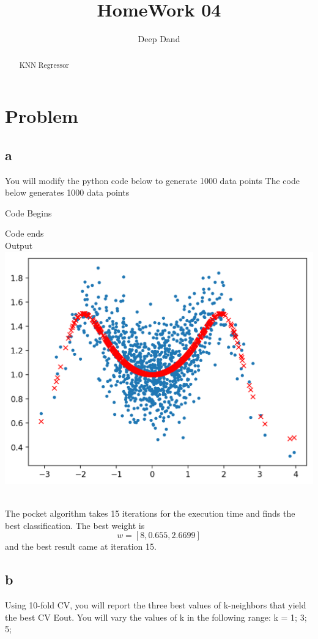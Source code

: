 \documentclass[10pt]{article}         %
\title{HomeWork 04}
\author{Deep Dand}
\begin{document}
\maketitle

\begin{abstract}
KNN Regressor
\end{abstract}

\section{Problem}
\subsection{a}
You will modify the python code below to generate 1000 data points
The code below generates 1000 data points 

Code Begins

Code ends
\\Output\\
\includegraphics[scale=0.45]{HW4_PartA}

\\The pocket algorithm takes 15 iterations for the execution time and finds the best classification. The best weight is $$w = [8,  0.655, 2.6699]$$ and the best result came at iteration 15.
\subsection{b}
Using 10-fold CV, you will report the three best values of k-neighbors that yield the best CV
Eout. You will vary the values of k in the following range: k = 1; 3; 5;
\end{document}
